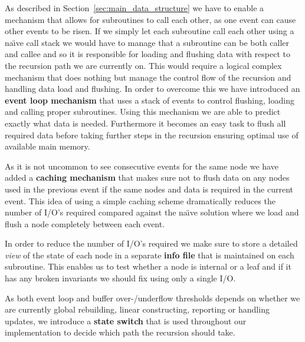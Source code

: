 \documentclass[twoside,11pt,openright]{report}
\begin{document}
As described in Section~\ref{sec:main_data_structure} we have to enable a mechanism that allows for subroutines to call each other, as one event can cause other events to be risen. If we simply let each subroutine call each other using a na\"{\i}ve call stack we would have to manage that a subroutine can be both caller and callee and so it is responsible for loading and flushing data with respect to the recursion path we are currently on. This would require a logical complex mechanism that does nothing but manage the control flow of the recursion and handling data load and flushing. In order to overcome this we have introduced an \textbf{event loop mechanism} that uses a stack of events to control flushing, loading and calling  proper subroutines. Using this mechanism we are able to predict exactly what data is needed. Furthermore it becomes an easy task to flush all required data before taking further steps in the recursion ensuring optimal use of available main memory.

As it is not uncommon to see consecutive events for the same node we have added a \textbf{caching mechanism} that makes sure not to flush data on any nodes used in the previous event if the same nodes and data is required in the current event. This idea of using a simple caching scheme dramatically reduces the number of I/O's required compared against the na\"{\i}ve solution where we load and flush a node completely between each event.

In order to reduce the number of I/O's required we make sure to store a detailed \textit{view} of the state of each node in a separate \textbf{info file} that is maintained on each subroutine. This enables us to test whether a node is internal or a leaf and if it has any broken invariants we should fix using only a single I/O.

As both event loop and buffer over-/underflow thresholds depends on whether we are currently global rebuilding, linear constructing, reporting or handling updates, we introduce a \textbf{state switch} that is used throughout our implementation to decide which path the recursion should take.
\end{document}
